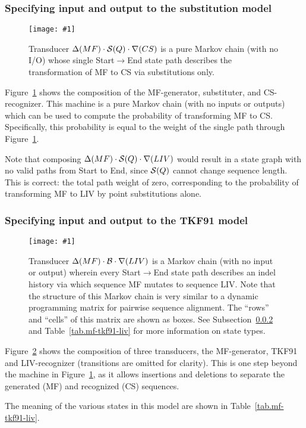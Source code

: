 \documentclass{article}
\newcommand{\secref}[1]{Subsection~\ref{sec.#1}}
\newcommand{\seclabel}[1]{\label{sec.#1}}
\newcommand{\tabnum}[1]{\ref{tab.#1}}
\newcommand{\tabref}[1]{Table~\tabnum{#1}}
\newcommand{\figref}[1]{Figure~\ref{Figures.#1}}
\newcommand{\figlabel}[1]{\label{Figures.#1}}
\newcommand{\easyfig}[4]{
\begin{figure}
\texttt{[image: \#1]}
\caption{ \figlabel{#3} #4}
\end{figure}}
\newcommand{\pdffig}[2]{\easyfig{#1-fig.pdf}{}{#1}{#2}}
\newcommand{\widepdffig}[2]{\easyfig{#1-fig.pdf}{width=\textwidth}{#1}{#2}}
\newcommand\substitute{{\cal S}}
\newcommand\tkf{{\cal B}}
\newcommand\generate{\Delta}
\newcommand\recognize{\nabla}
\begin{document}
\subsubsection{Specifying input and output to the substitution model}


\pdffig{mf-substituter-cs}{Transducer $\generate(MF) \cdot \substitute(Q) \cdot \recognize(CS)$ is a pure Markov chain (with no I/O) whose single Start$\to$End state path describes the transformation of MF to CS via substitutions only. }

\figref{mf-substituter-cs} shows the composition of the MF-generator, substituter, and CS-recognizer.  
This machine is a pure Markov chain (with no inputs or outputs) which can be used to compute 
the probability of transforming MF to CS.
Specifically, this probability is equal to the weight of the single path through \figref{mf-substituter-cs}.

Note that composing $\generate(MF) \cdot \substitute(Q) \cdot \recognize(LIV) $
would result in a state graph with no valid paths from Start to End, since $\substitute(Q)$ cannot change sequence length.  
This is correct: the total path weight of zero, corresponding to the probability of transforming MF to LIV by point substitutions alone.  


\subsubsection{Specifying input and output to the TKF91 model}
\seclabel{mf-tkf91-liv}

\widepdffig{mf-tkf91-liv}{Transducer $\generate(MF) \cdot \tkf \cdot \recognize(LIV)$ is a Markov chain (with no input or output) wherein every Start$\to$End state path describes an indel history
via which sequence MF mutates to sequence LIV. Note that the structure of this Markov chain is very similar to a dynamic programming matrix for pairwise sequence alignment. The ``rows'' and ``cells'' of this matrix are shown as boxes.
See \secref{mf-tkf91-liv} and \tabref{mf-tkf91-liv} for more information on state types.
}

\figref{mf-tkf91-liv} shows the composition of three transducers, the MF-generator, TKF91 and LIV-recognizer
(transitions are omitted for clarity).
This is one step beyond the machine in \figref{mf-substituter-cs}, as it allows 
insertions and deletions to separate the generated (MF) and recognized (CS) sequences.  

The meaning of the various states in this model are shown in \tabref{mf-tkf91-liv}.
\end{document}

